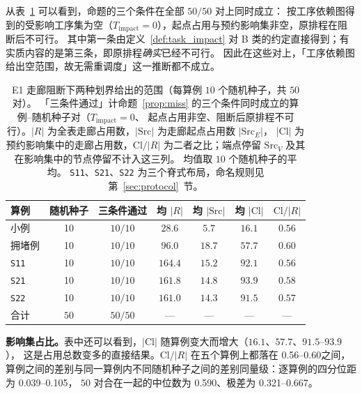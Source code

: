 \documentclass[manuscript,screen,review]{acmart}
\newcommand{\NSeeds}{10}
\newcommand{\NPairs}{50}
\newcommand{\PassMiss}{\NPairs/\NPairs}      %
\newcommand{\EoneCloLo}{0.56}
\newcommand{\EoneCloHi}{0.60}
\newcommand{\EoneFracIqrLo}{0.039}  %
\newcommand{\EoneFracIqrHi}{0.105}  %
\newcommand{\EoneFracMed}{0.590}    %
\newcommand{\EoneFracMin}{0.321}    %
\newcommand{\EoneFracMax}{0.667}    %
\begin{document}
从表~\ref{tab:e1} 可以看到，命题的三个条件在全部 \(\PassMiss\) 对上同时成立：
按工序依赖图得到的受影响工序集为空（\(T_{\mathrm{impact}}=0\)），起点占用与预约影响集非空，原排程在阻断后不可行。
其中第一条由定义~\ref{def:task_impact} 对 B 类的约定直接得到；有实质内容的是第三条，即原排程\emph{确实}已经不可行。
因此在这些对上，「工序依赖图给出空范围，故无需重调度」这一推断都不成立。

\begin{table}[t]
\centering
\caption{E1 走廊阻断下两种划界给出的范围（每算例 \(\NSeeds\) 个随机种子，共 \(\NPairs\) 对）。
「三条件通过」计命题~\ref{prop:miss} 的三个条件同时成立的算例--随机种子对（\(T_{\mathrm{impact}}=0\)、
起点占用非空、阻断后原排程不可行）。\(|R|\) 为全表走廊占用数，\(|\mathrm{Src}|\) 为走廊起点占用数 \(|\mathrm{Src}_E|\)，
\(|\mathrm{Cl}|\) 为预约影响集中的走廊占用数，\(\mathrm{Cl}/|R|\) 为二者之比；端点停留 \(\mathrm{Src}_V\) 及其在影响集中的节点停留不计入这三列。
均值取 \(\NSeeds\) 个随机种子的平均。
\texttt{S11}、\texttt{S21}、\texttt{S22} 为三个脊式布局，命名规则见第~\ref{sec:protocol}~节。}
\label{tab:e1}
\small
\begin{tabular}{@{}lcccccc@{}}
\toprule
算例 & 随机种子 & 三条件通过 & 均 \(|R|\) & 均 \(|\mathrm{Src}|\)
 & 均 \(|\mathrm{Cl}|\) & \(\mathrm{Cl}/|R|\) \\
\midrule
小例   & 10 & \(10/10\) & \(28.6\)  & \(5.7\)  & \(16.1\) & \(0.56\) \\
拥堵例 & 10 & \(10/10\) & \(96.0\) & \(18.7\) & \(57.7\) & \(0.60\) \\
\texttt{S11}  & 10 & \(10/10\) & \(164.4\) & \(15.2\) & \(92.1\) & \(0.56\) \\
\texttt{S21}    & 10 & \(10/10\) & \(161.8\) & \(14.8\) & \(93.9\) & \(0.58\) \\
\texttt{S22}     & 10 & \(10/10\) & \(161.0\) & \(14.3\) & \(91.5\) & \(0.57\) \\
\midrule
合计 & \(\NPairs\) & \(\PassMiss\) & --- & --- & --- & --- \\
\bottomrule
\end{tabular}
\end{table}

\textbf{影响集占比。}表中还可以看到，\(|\mathrm{Cl}|\) 随算例变大而增大（\(16.1\)、\(57.7\)、\(91.5\)--\(93.9\)），
这是占用总数变多的直接结果。\(\mathrm{Cl}/|R|\) 在五个算例上都落在 \EoneCloLo--\EoneCloHi 之间，
算例之间的差别与同一算例内不同随机种子之间的差别同量级：逐算例的四分位距为 \EoneFracIqrLo--\EoneFracIqrHi，
\(\NPairs\) 对合在一起的中位数为 \EoneFracMed、极差为 \EoneFracMin--\EoneFracMax。
\end{document}
